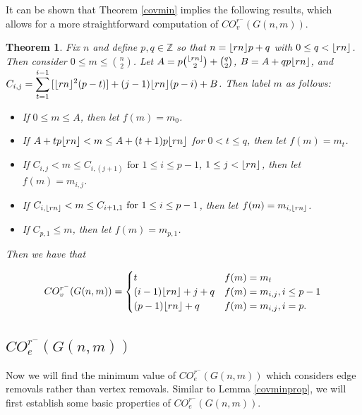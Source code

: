 \documentclass[12pt]{article}
\DeclarePairedDelimiter{\floor}{\lfloor}{\rfloor}
\newtheorem{theorem}{Theorem}[section]
\theoremstyle{definition}
\newcommand{\nice}{\displaystyle}
\newcommand{\COVMIN}[1]{CO^{r^-}_{v}(#1)}
\newcommand{\COEMIN}[1]{CO^{r^-}_{e}(#1)}
\begin{document}
It can be shown that Theorem \ref{covmin} implies the following results, which allows for a more straightforward computation of $\COVMIN{G(n,m)}$.
\begin{theorem}
Fix $n$ and define $p, q \in \mathbb{Z}$ so that $n=\floor{rn}p+q$ with $0 \leq q < \floor{rn}$. Then consider $0\le m \le {n \choose 2}$. Let $A=p{\floor{rn} \choose 2}+{q \choose 2}$, $B=A+qp\floor{rn}$, and $\nice C_{i,j}=\sum^{i-1}_{t=1}{[\floor{rn}^{2}(p-t)]} + (j-1)\floor{rn}(p-i)+B$. Then label $m$ as follows:

\begin{itemize}
  \item[] If $0 \le m \le A$, then let $f(m)=m_{0}$.
  
  \item[] If $A + tp\floor{rn} < m \le A+(t+1)p\floor{rn}$ for $0 < t \le q$, then let $f(m)=m_{t}$.
  
  \item[] If $C_{i,j}<m\le C_{i,(j+1)} \textrm{ for } 1\le i \le p-1$, $1 \le j < \floor{rn}$, then let $f(m) =m_{i,j}$.
  
  \item[] If $C_{i,\floor{rn}}<m\le C_{i+1,1} \textrm{ for } 1\le i \le p-1$, then let $f(m)=m_{i,\floor{rn}}$.
  
  \item[] If $C_{p,1} \leq m$, then let $f(m) = m_{p,1}$.
  
\end{itemize}
Then we have that

\[ \COVMIN{G(n,m)} =\begin{cases} 
   t & f(m)=m_{t} \\
   (i-1)\floor{rn}+j+q & f(m)=m_{i,j}, i\le p-1 \\
   (p-1)\floor{rn}+q & f(m)=m_{i,j}, i=p.
  \end{cases}
\]

\end{theorem}

\subsection{$\COEMIN{G(n,m)}$}

Now we will find the minimum value of $\COEMIN{G(n,m)}$ which considers edge removals rather than vertex removals. Similar to Lemma \ref{covminprop}, we will first establish some basic properties of $\COEMIN{G(n,m)}$. 
\end{document}
